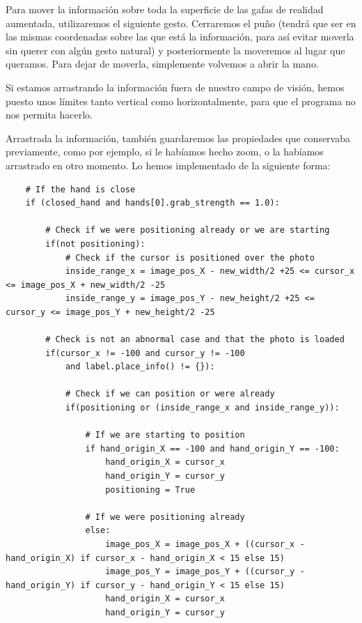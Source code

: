 \documentclass[11pt,a4paper]{article}
\begin{document}
Para mover la información sobre toda la superficie de las gafas de realidad aumentada, utilizaremos el siguiente gesto. Cerraremos el puño
(tendrá que ser en las mismas coordenadas sobre las que está la información, para así evitar moverla sin querer con algún gesto natural) y
posteriormente la moveremos al lugar que queramos. Para dejar de moverla, simplemente volvemos a abrir la mano.

Si estamos arrastrando la información fuera de nuestro campo de visión, hemos puesto unos límites tanto vertical como horizontalmente, para que
el programa no nos permita hacerlo.

Arrastrada la información, también guardaremos las propiedades que conservaba previamente, como por ejemplo, si le habíamos hecho zoom, o la
habíamos arrastrado en otro momento. Lo hemos implementado de la siguiente forma:
\begin{lstlisting}
	# If the hand is close
    if (closed_hand and hands[0].grab_strength == 1.0):

        # Check if we were positioning already or we are starting
        if(not positioning):
            # Check if the cursor is positioned over the photo
            inside_range_x = image_pos_X - new_width/2 +25 <= cursor_x <= image_pos_X + new_width/2 -25
            inside_range_y = image_pos_Y - new_height/2 +25 <= cursor_y <= image_pos_Y + new_height/2 -25

        # Check is not an abnormal case and that the photo is loaded
        if(cursor_x != -100 and cursor_y != -100
        	and label.place_info() != {}):

        	# Check if we can position or were already
            if(positioning or (inside_range_x and inside_range_y)):

            	# If we are starting to position
                if hand_origin_X == -100 and hand_origin_Y == -100:
                    hand_origin_X = cursor_x
                    hand_origin_Y = cursor_y
                    positioning = True

                # If we were positioning already
                else:
                    image_pos_X = image_pos_X + ((cursor_x - hand_origin_X) if cursor_x - hand_origin_X < 15 else 15)
                    image_pos_Y = image_pos_Y + ((cursor_y - hand_origin_Y) if cursor_y - hand_origin_Y < 15 else 15)
                    hand_origin_X = cursor_x
                    hand_origin_Y = cursor_y

\end{lstlisting}
\end{document}
